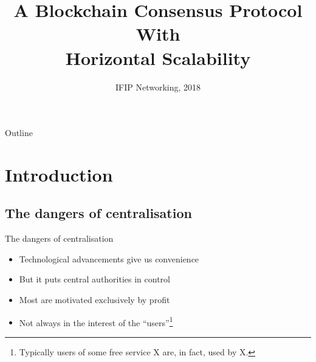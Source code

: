 \documentclass{beamer}
\title{A Blockchain Consensus Protocol With\\Horizontal Scalability}
\author[Short Name (U ABC)]{%
  \texorpdfstring{%
    \begin{columns}
      \column{.3333\linewidth}
      \centering
      Kelong~Cong \\ \small kelong.cong@epfl.ch \\ EPFL
      \column{.3333\linewidth}
      \centering
      Zhijie~Ren \\ \small z.ren@tudelft.nl \\ TU Delft
      \column{.3333\linewidth}
      \centering
      Johan~Pouwelse \\ \small peer2peer@gmail.com \\ TU Delft
    \end{columns}
 }
 {Author 1, Author 2, Author 3}
}
\date{IFIP Networking, 2018}
\begin{document}
\begin{frame}
  \titlepage

\end{frame}

\begin{frame}{Outline}
  \tableofcontents[]
\end{frame}

\section{Introduction}
\subsection{The dangers of centralisation}
\begin{frame}{The dangers of centralisation}
  \begin{itemize}
    \item Technological advancements give us convenience
    \item But it puts central authorities in control
    \item Most are motivated exclusively by profit
    \item Not always in the interest of the ``users''\footnote{Typically users of some free service X are, in fact, used by X.}
  \end{itemize}
\end{frame}
\end{document}
